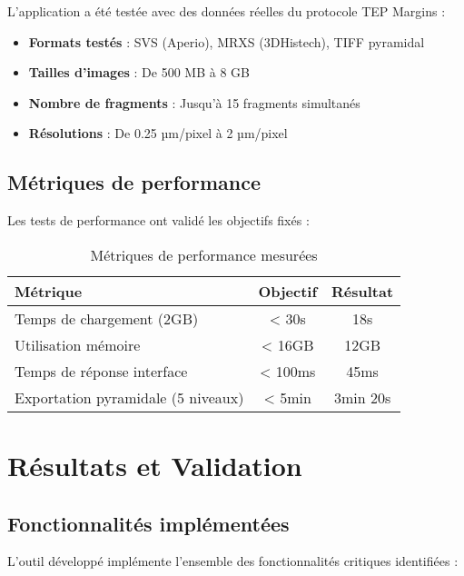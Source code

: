 \documentclass[12pt,a4paper]{report}
\begin{document}
L'application a été testée avec des données réelles du protocole TEP Margins :

\begin{itemize}
    \item \textbf{Formats testés} : SVS (Aperio), MRXS (3DHistech), TIFF pyramidal
    \item \textbf{Tailles d'images} : De 500 MB à 8 GB
    \item \textbf{Nombre de fragments} : Jusqu'à 15 fragments simultanés
    \item \textbf{Résolutions} : De 0.25 µm/pixel à 2 µm/pixel
\end{itemize}

\subsection{Métriques de performance}

Les tests de performance ont validé les objectifs fixés :

\begin{table}[H]
\centering
\caption{Métriques de performance mesurées}
\begin{tabular}{@{}lcc@{}}
\toprule
\textbf{Métrique} & \textbf{Objectif} & \textbf{Résultat} \\
\midrule
Temps de chargement (2GB) & < 30s & 18s \\
Utilisation mémoire & < 16GB & 12GB \\
Temps de réponse interface & < 100ms & 45ms \\
Exportation pyramidale (5 niveaux) & < 5min & 3min 20s \\
\bottomrule
\end{tabular}
\label{tab:metriques-performance}
\end{table}

\section{Résultats et Validation}

\subsection{Fonctionnalités implémentées}

L'outil développé implémente l'ensemble des fonctionnalités critiques identifiées :
\end{document}
